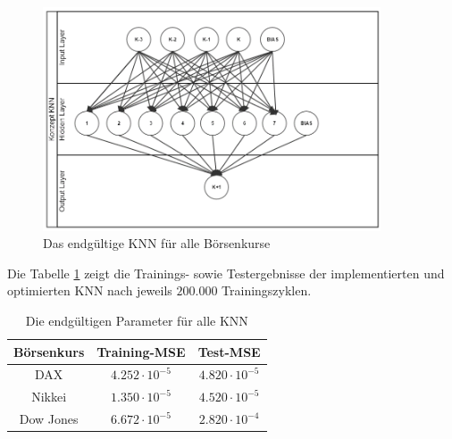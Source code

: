 \begin{figure}[H]
	\centering
	\includegraphics[width=10cm]{Bilder/Umsetzung/FertigKNN.png}
	\caption{Das endgültige KNN für alle Börsenkurse}
	\label{fig:ENDKNN}
\end{figure}

Die Tabelle \ref{tab:ENDval} zeigt die Trainings- sowie Testergebnisse der implementierten und optimierten KNN nach jeweils $200.000$ Trainingszyklen.

\begin{table}[H]
  \centering
  \begin{tabular}{|c|c|c|}
  \hline 
  \rule[0ex]{0pt}{2.5ex}  Börsenkurs & Training-MSE & Test-MSE\\ 
  \hline 
  \rule[0ex]{0pt}{2.5ex} DAX & $4.252\cdot10^{-5}$ & $4.820\cdot10^{-5}$  \\ 
  \hline 
  \rule[0ex]{0pt}{2.5ex} Nikkei & $1.350\cdot10^{-5}$ & $4.520\cdot10^{-5}$  \\ 
  \hline 
   \rule[0ex]{0pt}{2.5ex} Dow Jones & $6.672\cdot10^{-5}$ & $2.820\cdot10^{-4}$  \\ 
  \hline 
  \end{tabular} 
  \caption{Die endgültigen Parameter für alle KNN}
  \label{tab:ENDval}
\end{table}
